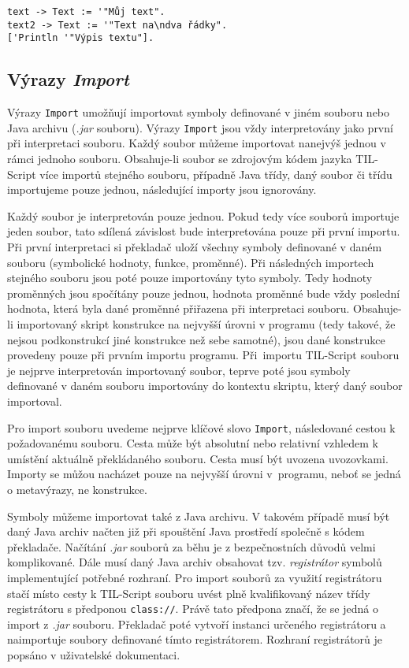 \begin{lstlisting}[caption={Příklad využití typu Text}]
text -> Text := '"Můj text".
text2 -> Text := '"Text na\ndva řádky".
['Println '"Výpis textu"].
\end{lstlisting}

\subsection{Výrazy \textit{Import}}\label{import-statement}

Výrazy \lstinline{Import} umožňují importovat symboly definované v jiném souboru nebo Java archivu
(\textit{.jar} souboru). Výrazy \lstinline{Import} jsou vždy interpretovány jako první při
interpretaci souboru. Každý soubor můžeme importovat nanejvýš jednou v rámci jednoho souboru.
Obsahuje-li soubor se zdrojovým kódem jazyka TIL-Script více importů stejného souboru, případně Java
třídy, daný soubor či třídu importujeme pouze jednou, následující importy jsou ignorovány.

Každý soubor je interpretován pouze jednou. Pokud tedy více souborů importuje jeden soubor, tato
sdílená závislost bude interpretována pouze při první importu. Při první interpretaci si překladač
uloží všechny symboly definované v daném souboru (symbolické hodnoty, funkce, proměnné).
Při následných importech stejného souboru jsou poté pouze importovány tyto symboly. Tedy hodnoty
proměnných jsou spočítány pouze jednou, hodnota proměnné bude vždy poslední hodnota, která byla
dané proměnné přiřazena při interpretaci souboru. Obsahuje-li importovaný skript konstrukce
na nejvyšší úrovni v programu (tedy takové, že nejsou podkonstrukcí jiné konstrukce než sebe
samotné), jsou dané konstrukce provedeny pouze při prvním importu programu. Při~importu TIL-Script
souboru je nejprve interpretován importovaný soubor, teprve poté jsou symboly definované v daném
souboru importovány do kontextu skriptu, který daný soubor importoval.

Pro import souboru uvedeme nejprve klíčové slovo \lstinline{Import}, následované cestou
k požadovanému souboru. Cesta může být absolutní nebo relativní vzhledem k umístění aktuálně
překládaného souboru. Cesta musí být uvozena uvozovkami. Importy se můžou nacházet pouze na nejvyšší
úrovni v~programu, neboť se jedná o metavýrazy, ne konstrukce.

Symboly můžeme importovat také z Java archivu. V takovém případě musí být daný Java archiv načten
již při spouštění Java prostředí společně s kódem překladače. Načítání \textit{.jar} souborů
za běhu je z bezpečnostních důvodů velmi komplikované. Dále musí daný Java archiv obsahovat tzv.
\textit{registrátor} symbolů implementující potřebné rozhraní. Pro import souborů
za využití registrátoru stačí místo cesty k TIL-Script souboru uvést plně kvalifikovaný název
třídy registrátoru s předponou \lstinline{class://}. Právě tato předpona značí, že se jedná o
import z \textit{.jar} souboru. Překladač poté vytvoří instanci určeného registrátoru a naimportuje
soubory definované tímto registrátorem. Rozhraní registrátorů je popsáno v uživatelské dokumentaci.

